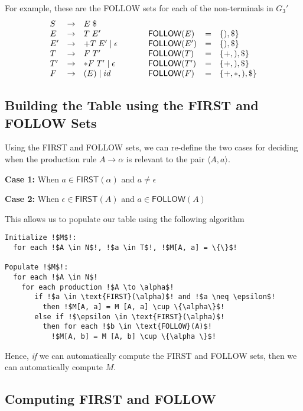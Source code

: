 For example, these are the \textsf{FOLLOW} sets for each of the non-terminals in $G_3'$
\[
\begin{array}{lllp{4ex}lll}
S  & \to & E\;\$                                                         \\
E  & \to & T\;E'                 &  & \textsf{FOLLOW}(E)  & = & \{),\$\}   \\
E' & \to & + T\;E' \mid \epsilon &  & \textsf{FOLLOW}(E') & = & \{),\$\}   \\
T  & \to & F\;T'                  &  & \textsf{FOLLOW}(T)  & = & \{+,),\$\} \\
T' & \to & * F\;T' \mid \epsilon &  & \textsf{FOLLOW}(T') & = & \{+,),\$\} \\
F  & \to & (E) \mid id          &  & \textsf{FOLLOW}(F)  & = & \{+,*,),\$\} 
\end{array}
\]

\subsection{Building the Table using the FIRST and FOLLOW Sets}\label{section:building-the-table-using-first-follow}
Using the \textsf{FIRST} and \textsf{FOLLOW} sets, we can re-define the two cases for deciding when the production rule $A \rightarrow \alpha$ is relevant to the pair $\langle A, a \rangle$.

\textbf{Case 1:} When $a \in \textsf{FIRST}(\alpha)$ and $a \neq \epsilon$

\textbf{Case 2:} When $\epsilon \in \textsf{FIRST}(A)$ and $a \in \textsf{FOLLOW}(A)$

This allows us to populate our table using the following algorithm

\begin{lstlisting}[style=pseudocode]
Initialize !$M$!:
  for each !$A \in N$!, !$a \in T$!, !$M[A, a] = \{\}$!

Populate !$M$!:
  for each !$A \in N$!
    for each production !$A \to \alpha$!
       if !$a \in \text{FIRST}(\alpha)$! and !$a \neq \epsilon$!
         then !$M[A, a] = M [A, a] \cup \{\alpha\}$!
       else if !$\epsilon \in \text{FIRST}(\alpha)$!
         then for each !$b \in \text{FOLLOW}(A)$!
           !$M[A, b] = M [A, b] \cup \{\alpha \}$!
\end{lstlisting}

Hence, \textit{if} we can automatically compute the \textsf{FIRST} and \textsf{FOLLOW} sets, then we can automatically compute $M$.

\subsection{Computing FIRST and FOLLOW}\label{section:computing-first-follow}
